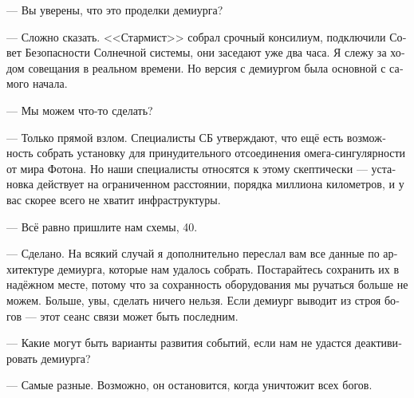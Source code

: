\documentclass[a4paper,10pt,fleqn]{book}\usepackage{polyglossia}\setdefaultlanguage[babelshorthands=true]{russian}\setotherlanguage{english}\defaultfontfeatures{Ligatures=TeX,Mapping=tex-text}\usepackage{xcolor}\newcommand{\ml}[3]{#2}
\begin{document}
\ml{$0$}
{--- Вы уверены, что это проделки демиурга?}
{``Are you sure the demiurge has something to do with that?''}

\ml{$0$}
{--- Сложно сказать.}
{``We're not.}
\ml{$0$}
{<<Стармист>> собрал срочный консилиум, подключили Совет Безопасности Солнечной системы, они заседают уже два часа.}
{\textsc{Starmist} have summoned an emergency meeting, even Solar Security Council are invited, they've been in session for nearly two hours now.}
\ml{$0$}
{Я слежу за ходом совещания в реальном времени.}
{I'm following all proceedings of the meeting in real time.}
\ml{$0$}
{Но версия с демиургом была основной с самого начала.}
{But interference of the demiurge was our best guess from the beginning.''}

\ml{$0$}
{--- Мы можем что-то сделать?}
{``What can we do?''}

\ml{$0$}
{--- Только прямой взлом.}
{``Your only option is to hack that thing.}
\ml{$0$}
{Специалисты СБ утверждают, что ещё есть возможность собрать установку для принудительного отсоединения омега-сингулярности от мира Фотона.}
{SSC specialists say that you have the opportunity to assembly a machine which can sever the connection between omega singularity and Photon Universe.}
\ml{$0$}
{Но наши специалисты относятся к этому скептически --- установка действует на ограниченном расстоянии, порядка миллиона километров, и у вас скорее всего не хватит инфраструктуры.}
{But our specialists are skeptical, because the machine has limited range, about one million kilometers, and most likely your infrastructure is insufficient.''}

\ml{$0$}
{--- Всё равно пришлите нам схемы, 40.}
{``Send us the blueprints anyway, 40.''}

\ml{$0$}
{--- Сделано.}
{``It's done.}
\ml{$0$}
{На всякий случай я дополнительно переслал вам все данные по архитектуре демиурга, которые нам удалось собрать.}
{Just in case, I send you all the data on the demiurge architecture we could collect.}
Постарайтесь сохранить их в надёжном месте, потому что за сохранность оборудования мы ручаться больше не можем.
\ml{$0$}
{Больше, увы, сделать ничего нельзя.}
{And, I'm afraid, we've run out of options.}
Если демиург выводит из строя богов --- этот сеанс связи может быть последним.

--- Какие могут быть варианты развития событий, если нам не удастся деактивировать демиурга?

--- Самые разные.
Возможно, он остановится, когда уничтожит всех богов.
\end{document}
